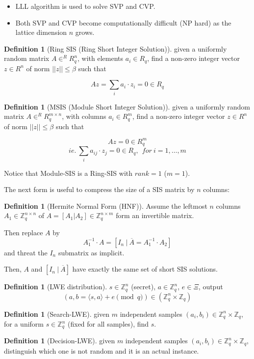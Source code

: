 \documentclass{article}
\theoremstyle{definition}
\newtheorem{defn}[thm]{Definition}
\newcommand{\Zz}{\mathbb{Z}}
\begin{document}
\begin{itemize}
\item LLL algorithm is used to solve SVP and CVP.

  \item Both SVP and CVP become computationally difficult (NP hard) as the lattice dimension $n$ grows.
\end{itemize}



\begin{defn}[Ring SIS (Ring Short Integer Solution)]
given a uniformly random matrix $A \in^R R_q^n$, with elements $a_i \in R_q$, find a non-zero integer vector $z \in R^n$ of norm $||z|| \leq \beta$ such that

$$A z = \sum_i a_i \cdot z_i = 0 \in R_q$$
\end{defn}

\begin{defn}[MSIS (Module Short Integer Solution)]
given a uniformly random matrix $A \in^R R_q^{m \times n}$, with columns $a_i \in R_q^m$, find a non-zero integer vector $z \in R^n$ of norm $||z|| \leq \beta$ such that

$$A z = 0 \in R_q^m$$
$$ie.~ \sum_i a_{ij} \cdot z_j = 0 \in R_q, ~~for~ i=1, \ldots, m$$
\end{defn}

Notice that Module-SIS is a Ring-SIS with $rank=1$ ($m=1$).

The next form is useful to compress the size of a SIS matrix by $n$ columns: 
\begin{defn}[Hermite Normal Form (HNF)]
  Assume the leftmost $n$ columns $A_1 \in \Zz_q^{n \times n}$ of $A=[A_1|A_2] \in \Zz_q^{n \times m}$ form an invertible matrix.

  Then replace $A$ by
  $$A_1^{-1} \cdot A = [ I_n ~|~ \overline{A} = A_1^{-1} \cdot A_2]$$
  and threat the $I_n$ submatrix as implicit.

  Then, $A$ and $[I_n ~|~ \overline{A}]$ have exactly the same set of short SIS solutions.
\end{defn}

\begin{defn}[LWE distribution]
  $s \in \Zz_q^n$ (secret), $a \in \Zz_q^n$, $e \in \Xi$, output
  $$(a, b= \langle s, a \rangle + e \pmod q) \in (\Zz_q^n \times \Zz_q)$$
\end{defn}

\begin{defn}[Search-LWE]
  given $m$ independent samples $(a_i, b_i) \in \Zz_q^n \times \Zz_q$, for a uniform $s \in \Zz_q^n$ (fixed for all samples), find $s$.
\end{defn}
\begin{defn}[Decision-LWE]
  given $m$ independent samples $(a_i, b_i) \in \Zz_q^n \times \Zz_q$, distinguish which one is not random and it is an actual instance.
\end{defn}
\end{document}
